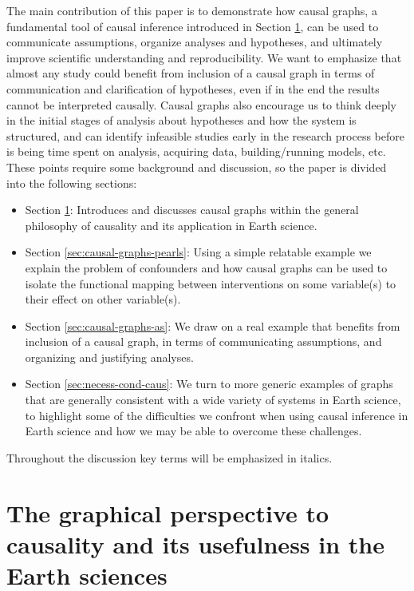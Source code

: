 \documentclass[12pt]{article}
\begin{document}
The main contribution of this paper is to demonstrate how causal
graphs, a fundamental tool of causal inference introduced in Section
\ref{sec:what-caus-caus}, can be used to communicate assumptions,
organize analyses and hypotheses, and ultimately improve scientific
understanding and reproducibility. We want to emphasize that almost
any study could benefit from inclusion of a causal graph in terms of
communication and clarification of hypotheses, even if in the end the
results cannot be interpreted causally. Causal graphs also encourage
us to think deeply in the initial stages of analysis about hypotheses
and how the system is structured, and can identify infeasible studies
early in the research process before is being time spent on analysis,
acquiring data, building/running models, etc. These points require
some background and discussion, so the paper is divided into the
following sections:

\begin{itemize}
\item Section \ref{sec:what-caus-caus}: Introduces and discusses
  causal graphs within the general philosophy of causality and its
  application in Earth science.
\item Section \ref{sec:causal-graphs-pearls}: Using a simple relatable
  example we explain the problem of confounders and how causal graphs
  can be used to isolate the functional mapping between interventions
  on some variable(s) to their effect on other variable(s).
\item Section \ref{sec:causal-graphs-as}: We draw on a real example
  that benefits from inclusion of a causal graph, in terms of
  communicating assumptions, and organizing and justifying analyses.
\item Section \ref{sec:necess-cond-caus}: We turn to more generic
  examples of graphs that are generally consistent with a wide variety
  of systems in Earth science, to highlight some of the difficulties
  we confront when using causal inference in Earth science and how we
  may be able to overcome these challenges.
\end{itemize}

Throughout the discussion key terms will be emphasized in italics.

\section{The graphical
  perspective to causality and its usefulness in the Earth
  sciences}\label{sec:what-caus-caus}
\end{document}

